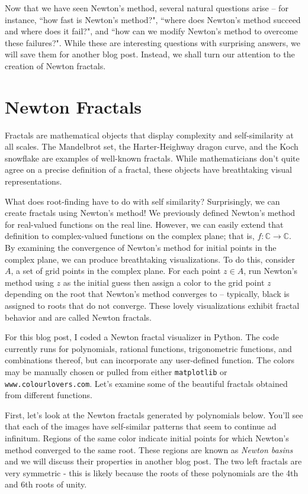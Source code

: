 \documentclass{book}
\begin{document}
Now that we have seen Newton's method, several natural questions arise -- for instance, ``how fast is Newton's method?", ``where does Newton's method succeed and where does it fail?", and ``how can we modify Newton's method to overcome these failures?". While these are interesting questions with surprising answers, we will save them for another blog post. Instead, we shall turn our attention to the creation of Newton fractals.

\section{Newton Fractals}
Fractals are mathematical objects that display complexity and self-similarity at all scales. The Mandelbrot set, the Harter-Heighway dragon curve, and the Koch snowflake are examples of well-known fractals. While mathematicians don't quite agree on a precise definition of a fractal, these objects have breathtaking visual representations.

What does root-finding have to do with self similarity? Surprisingly, we can create fractals using Newton's method! We previously defined Newton's method for real-valued functions on the real line. However, we can easily extend that definition to complex-valued functions on the complex plane; that is, $f: \mathbb{C} \rightarrow \mathbb{C}$. By examining the convergence of Newton's method for initial points in the complex plane, we can produce breathtaking visualizations. To do this, consider $A$, a set of grid points in the complex plane. For each point $z \in A$, run Newton's method using $z$ as the initial guess then assign a color to the grid point $z$ depending on the root that Newton's method converges to -- typically, black is assigned to roots that do not converge. These lovely visualizations exhibit fractal behavior and are called Newton fractals.

For this blog post, I coded a Newton fractal visualizer in Python. The code currently runs for polynomials, rational functions, trigonometric functions, and combinations thereof, but can incorporate any user-defined function. The colors may be manually chosen or pulled from either \texttt{matplotlib} or \texttt{www.colourlovers.com}. Let's examine some of the beautiful fractals obtained from different functions. 

First, let's look at the Newton fractals generated by polynomials below. You'll see that each of the images have self-similar patterns that seem to continue ad infinitum. Regions of the same color indicate initial points for which Newton's method converged to the same root. These regions are known as \textit{Newton basins} and we will discuss their properties in another blog post. The two left fractals are very symmetric - this is likely because the roots of these polynomials are the 4th and 6th roots of unity.  
\end{document}
